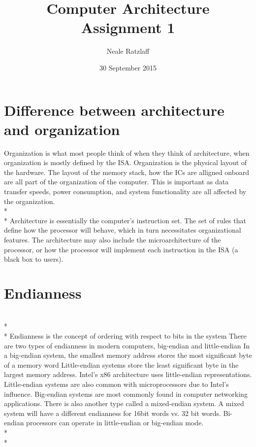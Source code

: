 \documentclass[letterpaper,10pt,titlepage]{article}
\title{Computer Architecture Assignment 1}
\author{Neale Ratzlaff}
\date{30 September 2015}
\begin{document}
\maketitle
\pagebreak

\section{Difference between architecture and organization}
    \newline
    \newline
    Organization is what most people think of when they think of architecture,
    when organization is mostly defined by the ISA. Organization is the physical layout of the 
    hardware. The layout of the memory stack, how the ICs are alligned onboard are all part 
    of the organization of the computer. This is important as data transfer speeds, power
    consumption, and system functionality are all affected by the organization. 
    \\*
    \\*
    Architecture is essentially the computer's instruction set. The set of rules that define how 
    the processor will behave, which in turn necessitates organizational features. The architecture
    may also include the microarchitecture of the processor, or how the processor will implement
    each instruction in the ISA (a black box to users). 


\pagebreak

\section{Endianness}
    \\*
    \\*
    Endianness is the concept of ordering with respect to bits in the system 
    There are two types of endianness in modern computers, big-endian and little-endian 
    In a big-endian system, the smallest memory address stores the most significant byte of a memory word 
    Little-endian systems store the least significant byte in the largest memory address. 
    Intel's x86 architecture uses little-endian representations. Little-endian systems 
    are also common with microprocessors due to Intel's influence. Big-endian 
    systems are most commonly found in computer networking applications. 
    There is also another type called a mixed-endian system. A mixed system will have 
    a different endianness for 16bit words vs. 32 bit words. Bi-endian processors 
    can operate in little-endian or big-endian mode. 
    \\*
    \\*
    
\end{document}
